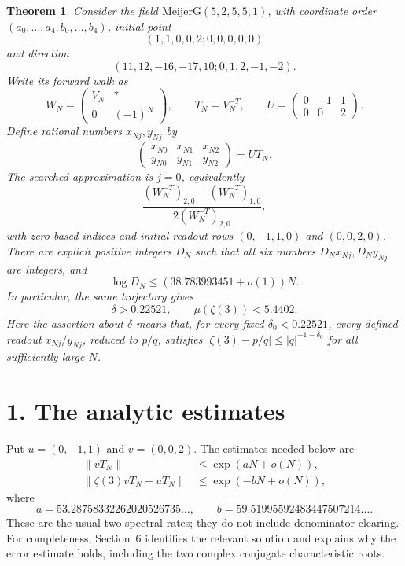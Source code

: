 \documentclass[11pt]{article}
\newtheorem{theorem}{Theorem}
\newcommand{\z}{\zeta(3)}
\begin{document}
\begin{theorem}\label{thm:main}
Consider the field $\mathrm{MeijerG}(5,2,5,5,1)$, with coordinate order
$(a_0,\ldots,a_4,b_0,\ldots,b_4)$, initial point
\[
 (1,1,0,0,2;0,0,0,0,0)
\]
and direction
\[
 (11,12,-16,-17,10;0,1,2,-1,-2).
\]
Write its forward walk as
\[
 W_N=\begin{pmatrix}V_N&*\\0&(-1)^N\end{pmatrix},\qquad
 T_N=V_N^{-T},\qquad
 U=\begin{pmatrix}0&-1&1\\0&0&2\end{pmatrix}.
\]
Define rational numbers $x_{Nj},y_{Nj}$ by
\[
 \begin{pmatrix}x_{N0}&x_{N1}&x_{N2}\\y_{N0}&y_{N1}&y_{N2}\end{pmatrix}=UT_N.
\]
The searched approximation is $j=0$, equivalently
\[
 \frac{(W_N^{-T})_{2,0}-(W_N^{-T})_{1,0}}{2(W_N^{-T})_{2,0}},
\]
with zero-based indices and initial readout rows $(0,-1,1,0)$ and $(0,0,2,0)$.
There are explicit positive integers $D_N$ such that all six numbers
$D_Nx_{Nj},D_Ny_{Nj}$ are integers, and
\[
 \log D_N\le (38.783993451+o(1))N.
\]
In particular, the same trajectory gives
\[
 \boxed{\delta>0.22521,\qquad \mu(\zeta(3))<5.4402.}
\]
Here the assertion about $\delta$ means that, for every fixed
$\delta_0<0.22521$, every defined readout $x_{Nj}/y_{Nj}$, reduced to
$p/q$, satisfies $|\z-p/q|\le |q|^{-1-\delta_0}$ for all sufficiently large $N$.
\end{theorem}

\section*{1. The analytic estimates}
Put $u=(0,-1,1)$ and $v=(0,0,2)$. The estimates needed below are
\begin{align}
 \|vT_N\|&\le \exp(aN+o(N)),\label{eq:qgrowth}\\
 \|\z vT_N-uT_N\|&\le \exp(-bN+o(N)),\label{eq:error}
\end{align}
where
\[
 a=53.28758332262020526735\ldots,\qquad
 b=59.51995592483447507214\ldots.
\]
These are the usual two spectral rates; they do not include denominator
clearing. For completeness, Section~6 identifies the relevant solution and
explains why the error estimate holds, including the two complex conjugate
characteristic roots.
\end{document}

